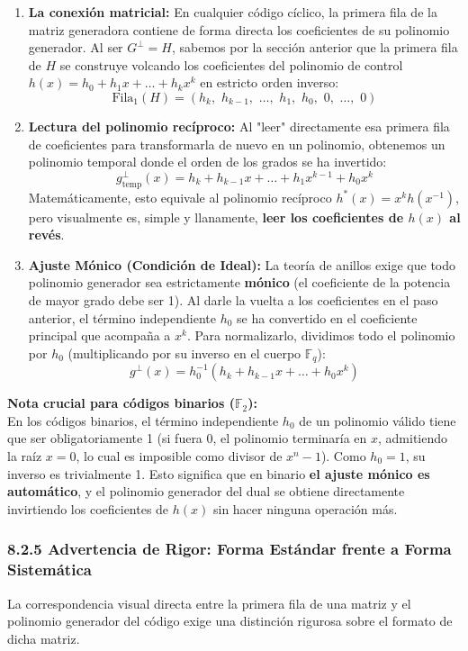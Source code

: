 \documentclass{article}
\begin{document}
\begin{enumerate}
    \item \textbf{La conexión matricial:} 
    En cualquier código cíclico, la primera fila de la matriz generadora contiene de forma directa los coeficientes de su polinomio generador. Al ser $G^\perp = H$, sabemos por la sección anterior que la primera fila de $H$ se construye volcando los coeficientes del polinomio de control $h(x) = h_0 + h_1x + \dots + h_kx^k$ en estricto orden inverso:
    \[ \text{Fila}_1(H) = (h_k, \,\, h_{k-1}, \,\, \dots, \,\, h_1, \,\, h_0, \,\, 0, \,\, \dots, \,\, 0) \]

    \item \textbf{Lectura del polinomio recíproco:} 
    Al "leer" directamente esa primera fila de coeficientes para transformarla de nuevo en un polinomio, obtenemos un polinomio temporal donde el orden de los grados se ha invertido:
    \[ g^\perp_{\text{temp}}(x) = h_k + h_{k-1}x + \dots + h_1x^{k-1} + h_0x^k \]
    Matemáticamente, esto equivale al polinomio recíproco $h^*(x) = x^k h(x^{-1})$, pero visualmente es, simple y llanamente, \textbf{leer los coeficientes de $h(x)$ al revés}.

    \item \textbf{Ajuste Mónico (Condición de Ideal):} 
    La teoría de anillos exige que todo polinomio generador sea estrictamente \textbf{mónico} (el coeficiente de la potencia de mayor grado debe ser 1). Al darle la vuelta a los coeficientes en el paso anterior, el término independiente $h_0$ se ha convertido en el coeficiente principal que acompaña a $x^k$. Para normalizarlo, dividimos todo el polinomio por $h_0$ (multiplicando por su inverso en el cuerpo $\mathbb{F}_q$):
    \[ g^\perp(x) = h_0^{-1} \left( h_k + h_{k-1}x + \dots + h_0x^k \right) \]
\end{enumerate}

\textbf{Nota crucial para códigos binarios ($\mathbb{F}_2$):}\\
En los códigos binarios, el término independiente $h_0$ de un polinomio válido tiene que ser obligatoriamente 1 (si fuera 0, el polinomio terminaría en $x$, admitiendo la raíz $x=0$, lo cual es imposible como divisor de $x^n-1$). 
Como $h_0 = 1$, su inverso es trivialmente 1. Esto significa que en binario \textbf{el ajuste mónico es automático}, y el polinomio generador del dual se obtiene directamente invirtiendo los coeficientes de $h(x)$ sin hacer ninguna operación más.

\subsubsection{8.2.5 Advertencia de Rigor: Forma Estándar frente a Forma Sistemática}
La correspondencia visual directa entre la primera fila de una matriz y el polinomio generador del código exige una distinción rigurosa sobre el formato de dicha matriz. 
\end{document}
